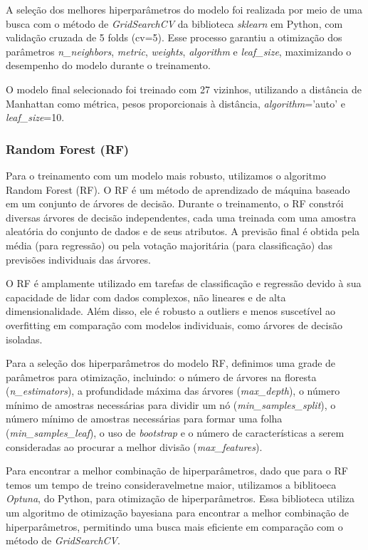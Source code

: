 A seleção dos melhores hiperparâmetros do modelo foi realizada por meio de uma busca com o método de \textit{GridSearchCV} da biblioteca \textit{sklearn} em Python, com validação cruzada de 5 folds (cv=5). Esse processo garantiu a otimização dos parâmetros \textit{n\_neighbors}, \textit{metric}, \textit{weights}, \textit{algorithm} e \textit{leaf\_size}, maximizando o desempenho do modelo durante o treinamento.

O modelo final selecionado foi treinado com 27 vizinhos, utilizando a distância de Manhattan como métrica, pesos proporcionais à distância, \textit{algorithm}='auto' e \textit{leaf\_size}=10.

\subsubsection*{Random Forest (RF)}\label{subsubsec:rf}
Para o treinamento com um modelo mais robusto, utilizamos o algoritmo Random Forest (RF). O RF é um método de aprendizado de máquina baseado em um conjunto de árvores de decisão. Durante o treinamento, o RF constrói diversas árvores de decisão independentes, cada uma treinada com uma amostra aleatória do conjunto de dados e de seus atributos. A previsão final é obtida pela média (para regressão) ou pela votação majoritária (para classificação) das previsões individuais das árvores.

O RF é amplamente utilizado em tarefas de classificação e regressão devido à sua capacidade de lidar com dados complexos, não lineares e de alta dimensionalidade. Além disso, ele é robusto a outliers e menos suscetível ao overfitting em comparação com modelos individuais, como árvores de decisão isoladas.

Para a seleção dos hiperparâmetros do modelo RF, definimos uma grade de parâmetros para otimização, incluindo: o número de árvores na floresta (\textit{n\_estimators}), a profundidade máxima das árvores (\textit{max\_depth}), o número mínimo de amostras necessárias para dividir um nó (\textit{min\_samples\_split}), o número mínimo de amostras necessárias para formar uma folha (\textit{min\_samples\_leaf}), o uso de \textit{bootstrap} e o número de características a serem consideradas ao procurar a melhor divisão (\textit{max\_features}).

Para encontrar a melhor combinação de hiperparâmetros, dado que para o RF temos um tempo de treino consideravelmetne maior, utilizamos a biblitoeca \textit{Optuna}, do Python, para otimização de hiperparâmetros. Essa biblioteca utiliza um algoritmo de otimização bayesiana para encontrar a melhor combinação de hiperparâmetros, permitindo uma busca mais eficiente em comparação com o método de \textit{GridSearchCV}.

